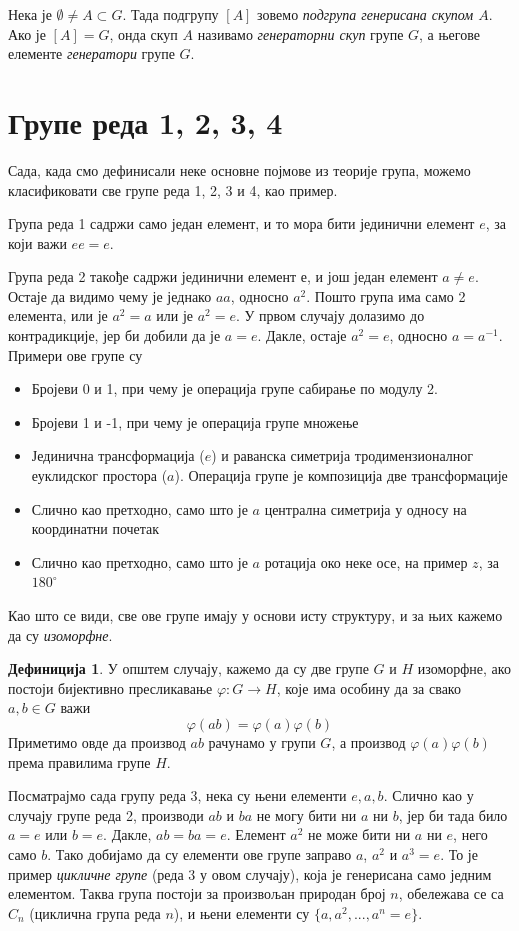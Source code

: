 \documentclass{report}
\theoremstyle{plain}
\theoremstyle{definition}
\newtheorem{defn}{Дефиниција}
\begin{document}
Нека је $\emptyset \neq A\subset G$. Тада подгрупу $[A]$ зовемо \emph{подгрупа генерисана скупом $A$}. Ако је $[A]=G$, онда скуп $A$ називамо \emph{генераторни скуп} групе $G$, а његове елементе \emph{генератори} групе $G$.


\section{Групе реда 1, 2, 3, 4}

Сада, када смо дефинисали неке основне појмове из теорије група, можемо класификовати све групе реда 1, 2, 3 и 4, као пример.

Група реда 1 садржи само један елемент, и то мора бити јединични елемент $e$, за који важи $ee=e$.

Група реда 2 такође садржи јединични елемент $е$, и још један елемент $a\neq e$. Остаје да видимо чему је једнако $aa$, односно $a^2$. Пошто група има само 2 елемента, или је $a^2 = a$ или је $a^2=e$. У првом случају долазимо до контрадикције, јер би добили да је $a=e$. Дакле, остаје $a^2=e$, односно $a=a^{-1}$. Примери ове групе су
\begin{itemize}
  \item Бројеви 0 и 1, при чему је операција групе сабирање по модулу 2.
  \item Бројеви 1 и -1, при чему је операција групе множење
  \item Јединична трансформација ($e$) и раванска симетрија тродимензионалног еуклидског простора ($a$). Операција групе је композиција две трансформације
  \item Слично као претходно, само што је $a$ централна симетрија у односу на координатни почетак
  \item Слично као претходно, само што је $a$ ротација око неке осе, на пример $z$, за $180^\circ$
\end{itemize}
Као што се види, све ове групе имају у основи исту структуру, и за њих кажемо да су \emph{изоморфне}.

\begin{defn}
У општем случају, кажемо да су две групе $G$ и $H$ изоморфне, ако постоји бијективно пресликавање $\varphi: G\to H$, које има особину да за свако $a, b\in G$ важи $$\varphi(ab) = \varphi(a)\varphi(b)$$
Приметимо овде да производ $ab$ рачунамо у групи $G$, а производ $\varphi(a)\varphi(b)$ према правилима групе $H$.
\end{defn}

Посматрајмо сада групу реда 3, нека су њени елементи $e, a, b$. Слично као у случају групе реда 2, производи $ab$ и $ba$ не могу бити ни $a$ ни $b$, јер би тада било $a=e$ или $b=e$. Дакле, $ab = ba = e$. Елемент $a^2$ не може бити ни $a$ ни $e$, него само $b$. Тако добијамо да су елементи ове групе заправо $a$, $a^2$ и $a^3 = e$. То је пример \emph{цикличне групе} (реда 3 у овом случају), која је генерисана само једним елементом. Таква група постоји за произвољан природан број $n$, обележава се са $C_n$ (циклична група реда $n$), и њени елементи су $\{a, a^2, ..., a^n = e\}$.
\end{document}

